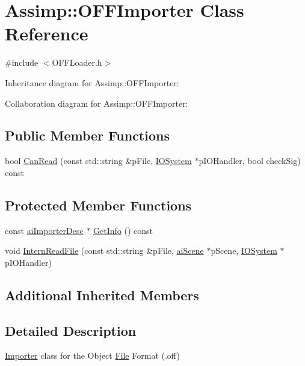\hypertarget{class_assimp_1_1_o_f_f_importer}{\section{Assimp\+:\+:O\+F\+F\+Importer Class Reference}
\label{class_assimp_1_1_o_f_f_importer}
}


{\ttfamily \#include $<$O\+F\+F\+Loader.\+h$>$}



Inheritance diagram for Assimp\+:\+:O\+F\+F\+Importer\+:


Collaboration diagram for Assimp\+:\+:O\+F\+F\+Importer\+:
\subsection*{Public Member Functions}
\begin{DoxyCompactItemize}
\item 
bool \hyperlink{class_assimp_1_1_o_f_f_importer_a1ffd2d54b2b27c6a76a70cbc35f4d999}{Can\+Read} (const std\+::string \&p\+File, \hyperlink{class_assimp_1_1_i_o_system}{I\+O\+System} $\ast$p\+I\+O\+Handler, bool check\+Sig) const 
\end{DoxyCompactItemize}
\subsection*{Protected Member Functions}
\begin{DoxyCompactItemize}
\item 
const \hyperlink{structai_importer_desc}{ai\+Importer\+Desc} $\ast$ \hyperlink{class_assimp_1_1_o_f_f_importer_a6fb99105f4666ee0a9a2d247a5db4e26}{Get\+Info} () const 
\item 
void \hyperlink{class_assimp_1_1_o_f_f_importer_a17abb1e1f7419354414e8d3245113742}{Intern\+Read\+File} (const std\+::string \&p\+File, \hyperlink{structai_scene}{ai\+Scene} $\ast$p\+Scene, \hyperlink{class_assimp_1_1_i_o_system}{I\+O\+System} $\ast$p\+I\+O\+Handler)
\end{DoxyCompactItemize}
\subsection*{Additional Inherited Members}


\subsection{Detailed Description}
\hyperlink{class_assimp_1_1_importer}{Importer} class for the Object \hyperlink{class_file}{File} Format (.off) 

